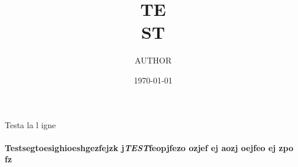 \documentclass{article}
\author{AUTHOR}
\date{\today}
\begin{document}
Test\newline a la l
igne

\title    {TE\\ST} 
\maketitle


\paragraph{Testsegtoesighioeshgezfejzk j\emph{TEST}feopjfezo ozjef ej aozj oejfeo ej zpo fz}
 
\end{document}
